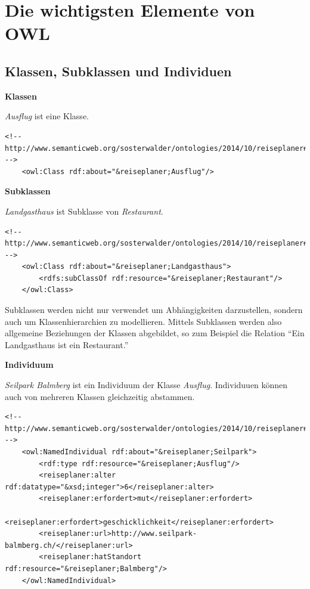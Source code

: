\section{Die wichtigsten Elemente von OWL}
\label{sec:owlRdf_owl_wichtigsteElemente}

\subsection{Klassen, Subklassen und Individuen}
\label{sec:owlRdf_owl_wissenModellieren_wichtigsteElemente_Classen}

\textbf{Klassen}

\textit{Ausflug} ist eine Klasse.

\begin{lstlisting}[caption={Beispiel einer Klasse}]
    <!-- http://www.semanticweb.org/sosterwalder/ontologies/2014/10/reiseplaner#Ausflug -->
    <owl:Class rdf:about="&reiseplaner;Ausflug"/>
\end{lstlisting}

\textbf{Subklassen}

\textit{Landgasthaus} ist Subklasse von \textit{Restaurant}.

\begin{lstlisting}[caption={Beispiel einer Subklasse}]
    <!-- http://www.semanticweb.org/sosterwalder/ontologies/2014/10/reiseplaner#Landgasthaus -->
    <owl:Class rdf:about="&reiseplaner;Landgasthaus">
        <rdfs:subClassOf rdf:resource="&reiseplaner;Restaurant"/>
    </owl:Class>
\end{lstlisting}
Subklassen werden nicht nur verwendet um Abhängigkeiten darzustellen, sondern auch um Klassenhierarchien zu modellieren. Mittels Subklassen werden also allgemeine Beziehungen der Klassen abgebildet, so zum Beispiel die Relation ``Ein Landgasthaus ist ein Restaurant.''

\textbf{Individuum}

\textit{Seilpark Balmberg} ist ein Individuum der Klasse \textit{Ausflug}. Individuuen können auch von mehreren Klassen gleichzeitig abstammen.

\begin{lstlisting}[caption={Beispiel eines Individuums}]
    <!-- http://www.semanticweb.org/sosterwalder/ontologies/2014/10/reiseplaner#Seilpark -->
    <owl:NamedIndividual rdf:about="&reiseplaner;Seilpark">
        <rdf:type rdf:resource="&reiseplaner;Ausflug"/>
        <reiseplaner:alter rdf:datatype="&xsd;integer">6</reiseplaner:alter>
        <reiseplaner:erfordert>mut</reiseplaner:erfordert>
        <reiseplaner:erfordert>geschicklichkeit</reiseplaner:erfordert>
        <reiseplaner:url>http://www.seilpark-balmberg.ch/</reiseplaner:url>
        <reiseplaner:hatStandort rdf:resource="&reiseplaner;Balmberg"/>
    </owl:NamedIndividual>
\end{lstlisting}

